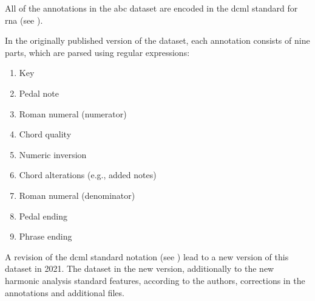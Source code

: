 
All of the annotations in the \gls{abc} dataset are encoded
in the \gls{dcml} standard for \gls{rna} (see
).


In the originally published version of the dataset, each
annotation consists of nine parts, which are parsed using
regular expressions:
\begin{enumerate}
    \item Key
    \item Pedal note
    \item Roman numeral (numerator)
    \item Chord quality
    \item Numeric inversion
    \item Chord alterations (e.g., added notes)
    \item Roman numeral (denominator)
    \item Pedal ending
    \item Phrase ending
\end{enumerate}


A revision of the \gls{dcml} standard notation (see
) lead to a new version of this
dataset in 2021. The dataset in the new version,
additionally to the new harmonic analysis standard features,
according to the authors, corrections in the annotations and
additional files.